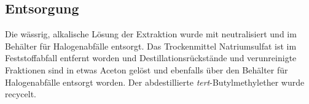 \subsection*{Entsorgung}
Die wässrig, alkalische Lösung der Extraktion wurde mit  neutralisiert und im Behälter für Halogenabfälle entsorgt. Das Trockenmittel Natriumsulfat ist im Feststoffabfall entfernt worden und Destillationsrückstände und verunreinigte Fraktionen sind in etwas Aceton gelöst und ebenfalls über den Behälter für Halogenabfälle entsorgt worden. Der abdestillierte \textit{tert}-Butylmethylether wurde recycelt.